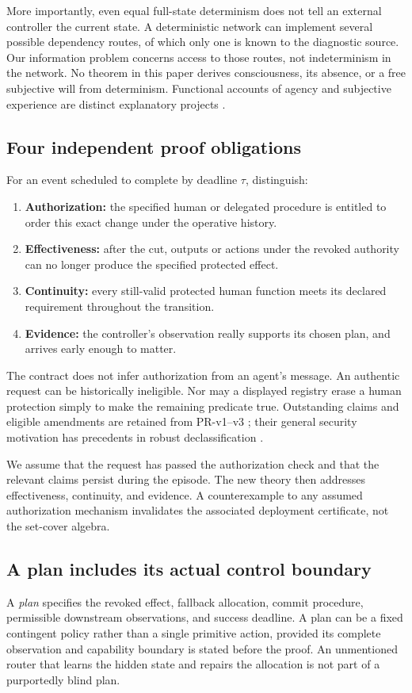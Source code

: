 \documentclass[11pt,a4paper]{article}
\theoremstyle{definition}\newtheorem{definition}{Definition}
\begin{document}
More importantly, even equal full-state determinism does not tell an external controller the current state. A deterministic network can implement several possible dependency routes, of which only one is known to the diagnostic source. Our information problem concerns access to those routes, not indeterminism in the network. No theorem in this paper derives consciousness, its absence, or a free subjective will from determinism. Functional accounts of agency and subjective experience are distinct explanatory projects \cite{kenton,uct}.

\subsection{Four independent proof obligations}
For an event scheduled to complete by deadline $\tau$, distinguish:
\begin{enumerate}
\item \textbf{Authorization:} the specified human or delegated procedure is entitled to order this exact change under the operative history.
\item \textbf{Effectiveness:} after the cut, outputs or actions under the revoked authority can no longer produce the specified protected effect.
\item \textbf{Continuity:} every still-valid protected human function meets its declared requirement throughout the transition.
\item \textbf{Evidence:} the controller's observation really supports its chosen plan, and arrives early enough to matter.
\end{enumerate}
The contract does not infer authorization from an agent's message. An authentic request can be historically ineligible. Nor may a displayed registry erase a human protection simply to make the remaining predicate true. Outstanding claims and eligible amendments are retained from PR-v1--v3 \cite{liu3}; their general security motivation has precedents in robust declassification \cite{myers}.

We assume that the request has passed the authorization check and that the relevant claims persist during the episode. The new theory then addresses effectiveness, continuity, and evidence. A counterexample to any assumed authorization mechanism invalidates the associated deployment certificate, not the set-cover algebra.

\subsection{A plan includes its actual control boundary}
A \emph{plan} specifies the revoked effect, fallback allocation, commit procedure, permissible downstream observations, and success deadline. A plan can be a fixed contingent policy rather than a single primitive action, provided its complete observation and capability boundary is stated before the proof. An unmentioned router that learns the hidden state and repairs the allocation is not part of a purportedly blind plan.
\end{document}
